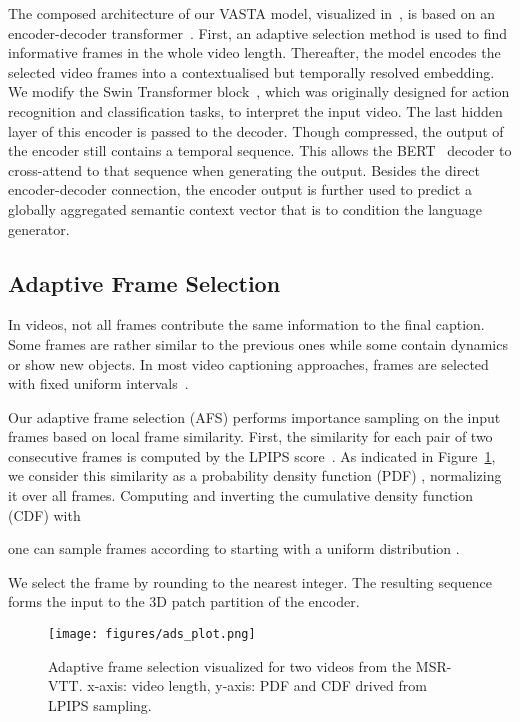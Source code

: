 \documentclass[runningheads,table]{llncs}
\newcommand{\modelName}{VASTA\xspace}
\begin{document}
The composed architecture of our \modelName model, visualized in~, is based on an encoder-decoder transformer~\cite{vaswani2017attention}.
First, an adaptive selection method is used to find informative frames in the whole video length. Thereafter, the model encodes the selected video frames into a contextualised but temporally resolved embedding.
We modify the Swin Transformer block~\cite{liu2021video}, which was originally designed for action recognition and classification tasks, to interpret the input video. 
The last hidden layer of this encoder is passed to the decoder. Though compressed, the output of the encoder still contains a temporal sequence. This allows the BERT~\cite{devlin2018bert} decoder to cross-attend to that sequence when generating the output. 
Besides the direct encoder-decoder connection, the encoder output is further used to predict a globally aggregated semantic context vector that is to condition the language generator. 

\subsection{Adaptive Frame Selection}\label{sec:adaptive_frame_selection}
In videos, not all frames contribute the same information to the final caption. Some frames are rather similar to the previous ones while some contain dynamics or show new objects. In most video captioning approaches, frames are selected with fixed uniform intervals~\cite{cherian2020spatio,tran2015learning,zhang2020object}. 


Our adaptive frame selection (AFS) performs importance sampling on the input frames based on local frame similarity. First, the similarity for each pair of two consecutive frames is computed by the LPIPS score~\cite{zhang2018perceptual}.
As indicated in Figure~\ref{fig:adaptive_frame_selection}, we consider this similarity as a probability density function (PDF) , normalizing it over all frames. Computing and inverting the cumulative density function (CDF)  with 



\noindent one can sample  frames  according to  starting with a uniform distribution .

We select the frame  by rounding to the nearest integer.  
The resulting sequence forms the input to the 3D patch partition of the encoder.

\begin{figure}[t]
    \centering
    \texttt{[image: figures/ads\_plot.png]}
     \vspace{-0.3cm}
    \caption{Adaptive frame selection visualized for two videos from the MSR-VTT. x-axis: video length, y-axis: PDF and CDF drived from LPIPS sampling.}\label{fig:adaptive_frame_selection}
\end{figure}
\end{document}
